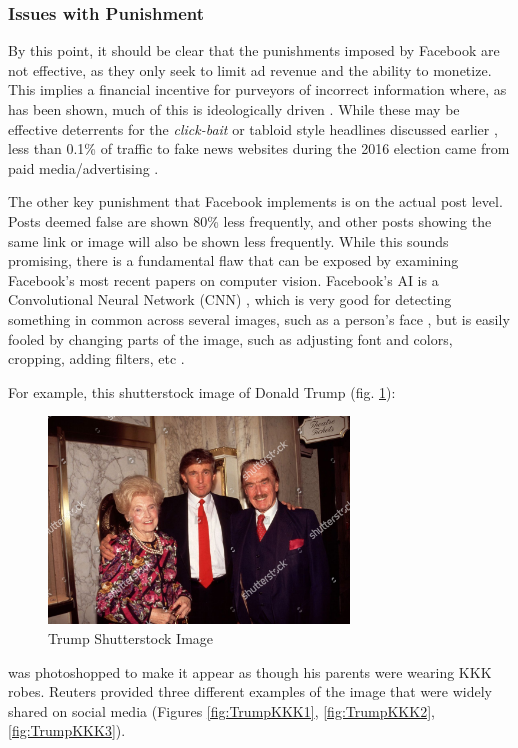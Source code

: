 \documentclass[12pt]{article}
\begin{document}
\subsubsection{Issues with Punishment}
By this point, it should be clear that the punishments imposed by Facebook are not effective, as they only seek to limit ad revenue and the ability to monetize. This implies a financial incentive for purveyors of incorrect information where, as has been shown, much of this is ideologically driven \cite{allcott2017social}. While these may be effective deterrents for the \textit{click-bait} or tabloid style headlines discussed earlier  \cite{chen2015misleading}, less than 0.1\% of traffic to fake news websites during the 2016 election came from paid media/advertising \cite{albright2016election2016}. 

The other key punishment that Facebook implements is on the actual post level. Posts deemed false are shown 80\% less frequently, and other posts showing the same link or image will also be shown less frequently. While this sounds promising, there is a fundamental flaw that can be exposed by examining Facebook's most recent papers on computer vision. Facebook's AI is a Convolutional Neural Network (CNN) \cite{carion2020end}, which is very good for detecting something in common across several images, such as a person's face \cite{kalinovskii2015compact}, but is easily fooled by changing parts of the image, such as adjusting font and colors, cropping, adding filters, etc \cite{sumbaly2020using}.

For example, this shutterstock image of Donald Trump (fig. \ref{fig:Trump Shutterstock Image}): 
 \begin{figure}[htp]
    \centering
    \includegraphics[width=8cm]{trumpkkk0.jpg}
    \caption{Trump Shutterstock Image}
    \label{fig:Trump Shutterstock Image}
\end{figure}

was photoshopped to make it appear as though his parents were wearing KKK robes. Reuters provided three different examples of the image that were widely shared on social media \cite{reuters2020trump} (Figures \ref{fig:TrumpKKK1}, \ref{fig:TrumpKKK2}, \ref{fig:TrumpKKK3}).
\end{document}
